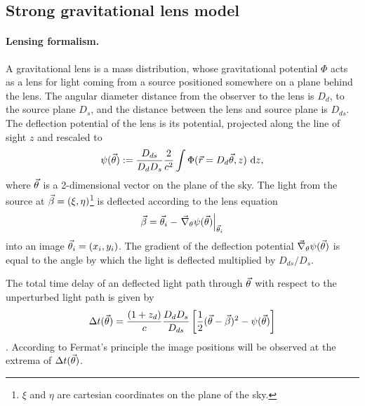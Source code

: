 \subsection{Strong gravitational lens model} \label{sec:lensing_theo}

\paragraph{Lensing formalism.} A gravitational lens is a mass distribution, whose gravitational potential $\Phi$ acts as a lens for light coming from a source positioned somewhere on a plane behind the lens. The angular diameter distance from the observer to the lens is $D_d$, to the source plane $D_s$, and the distance between the lens and source plane is $D_{ds}$. The deflection potential of the lens is its potential, projected along the line of sight $z$ and rescaled to
\begin{equation}
\psi(\vec{\theta}) := \frac{D_{ds}}{D_d D_s} \frac{2}{c^2} \int \Phi(\vec{r}=D_d \vec{\theta},z) {\ \mathrm d} z, \label{eq:psidef}
\end{equation}
where $\vec{\theta}$ is a 2-dimensional vector on the plane of the sky. The light from the source at $\vec{\beta} = (\xi,\eta)$\footnote{$\xi$ and $\eta$ are cartesian coordinates on the plane of the sky.} is deflected according to the lens equation
\begin{equation}
\vec{\beta} = \vec{\theta}_i - \left.\vec{\nabla}_\theta \psi(\vec{\theta})\right|_{\vec{\theta}_i} \label{eq:lenseqpot}
\end{equation}
into an image $\vec{\theta}_i = (x_i,y_i)$. The gradient of the deflection potential $\vec{\nabla}_\theta \psi(\vec{\theta})$ is equal to the angle by which the light is deflected multiplied by $D_{ds}/D_{s}$.

The total time delay of an deflected light path through $\vec{\theta}$ with respect to the unperturbed light path is given by 
\begin{equation}
\Delta t(\vec{\theta}) = \frac{(1+z_d)}{c} \frac{D_d D_s}{D_{ds}} \left[ \frac 12 (\vec{\theta} - \vec{\beta})^2 - \psi(\vec{\theta})\right] \label{eq:timedelay}
\end{equation}
\citep{BartGravLens}. According to Fermat's principle the image positions will be observed at the extrema of $\Delta t(\vec{\theta})$.

